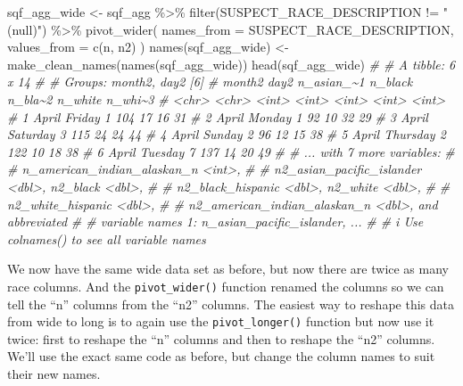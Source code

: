 \documentclass[
  a4paper,
]{krantz}
\makeatletter
\newenvironment{Shaded}{\begin{snugshade}}{\end{snugshade}}
\newcommand{\AttributeTok}[1]{\textcolor[rgb]{0.61,0.61,0.61}{#1}}
\newcommand{\CommentTok}[1]{\textcolor[rgb]{0.37,0.37,0.37}{\textit{#1}}}
\newcommand{\FunctionTok}[1]{\textcolor[rgb]{0,0,0}{#1}}
\newcommand{\NormalTok}[1]{#1}
\newcommand{\OtherTok}[1]{\textcolor[rgb]{0.37,0.37,0.37}{#1}}
\newcommand{\SpecialCharTok}[1]{\textcolor[rgb]{0,0,0}{#1}}
\newcommand{\StringTok}[1]{\textcolor[rgb]{0.5,0.5,0.5}{#1}}
\newenvironment{kframe}{%
\medskip{}
\setlength{\fboxsep}{.8em}
 \def\at@end@of@kframe{}%
 \ifinner\ifhmode%
  \def\at@end@of@kframe{\end{minipage}}%
  \begin{minipage}{\columnwidth}%
 \fi\fi%
 \def\FrameCommand##1{\hskip\@totalleftmargin \hskip-\fboxsep
 \colorbox{shadecolor}{##1}\hskip-\fboxsep
     \hskip-\linewidth \hskip-\@totalleftmargin \hskip\columnwidth}%
 \MakeFramed {\advance\hsize-\width
   \@totalleftmargin\z@ \linewidth\hsize
   \@setminipage}}%
 {\par\unskip\endMakeFramed%
 \at@end@of@kframe}
\renewenvironment{Shaded}{\begin{kframe}}{\end{kframe}}
\makeatother
\begin{document}
\begin{Shaded}
\begin{Highlighting}[]
\NormalTok{sqf\_agg\_wide }\OtherTok{\textless{}{-}}\NormalTok{ sqf\_agg }\SpecialCharTok{\%\textgreater{}\%}
  \FunctionTok{filter}\NormalTok{(SUSPECT\_RACE\_DESCRIPTION }\SpecialCharTok{!=} \StringTok{"(null)"}\NormalTok{) }\SpecialCharTok{\%\textgreater{}\%}
  \FunctionTok{pivot\_wider}\NormalTok{(}
    \AttributeTok{names\_from =}\NormalTok{ SUSPECT\_RACE\_DESCRIPTION,}
    \AttributeTok{values\_from =} \FunctionTok{c}\NormalTok{(n, n2)}
\NormalTok{  )}
\FunctionTok{names}\NormalTok{(sqf\_agg\_wide) }\OtherTok{\textless{}{-}} \FunctionTok{make\_clean\_names}\NormalTok{(}\FunctionTok{names}\NormalTok{(sqf\_agg\_wide))}
\FunctionTok{head}\NormalTok{(sqf\_agg\_wide)}
\CommentTok{\# \# A tibble: 6 x 14}
\CommentTok{\# \# Groups:   month2, day2 [6]}
\CommentTok{\#   month2 day2     n\_asian\_\textasciitilde{}1 n\_black n\_bla\textasciitilde{}2 n\_white n\_whi\textasciitilde{}3}
\CommentTok{\#   \textless{}chr\textgreater{}  \textless{}chr\textgreater{}         \textless{}int\textgreater{}   \textless{}int\textgreater{}   \textless{}int\textgreater{}   \textless{}int\textgreater{}   \textless{}int\textgreater{}}
\CommentTok{\# 1 April  Friday            1     104      17      16      31}
\CommentTok{\# 2 April  Monday            1      92      10      32      29}
\CommentTok{\# 3 April  Saturday          3     115      24      24      44}
\CommentTok{\# 4 April  Sunday            2      96      12      15      38}
\CommentTok{\# 5 April  Thursday          2     122      10      18      38}
\CommentTok{\# 6 April  Tuesday           7     137      14      20      49}
\CommentTok{\# \# ... with 7 more variables:}
\CommentTok{\# \#   n\_american\_indian\_alaskan\_n \textless{}int\textgreater{},}
\CommentTok{\# \#   n2\_asian\_pacific\_islander \textless{}dbl\textgreater{}, n2\_black \textless{}dbl\textgreater{},}
\CommentTok{\# \#   n2\_black\_hispanic \textless{}dbl\textgreater{}, n2\_white \textless{}dbl\textgreater{},}
\CommentTok{\# \#   n2\_white\_hispanic \textless{}dbl\textgreater{},}
\CommentTok{\# \#   n2\_american\_indian\_alaskan\_n \textless{}dbl\textgreater{}, and abbreviated}
\CommentTok{\# \#   variable names 1: n\_asian\_pacific\_islander, ...}
\CommentTok{\# \# i Use \textasciigrave{}colnames()\textasciigrave{} to see all variable names}
\end{Highlighting}
\end{Shaded}

We now have the same wide data set as before, but now there
are twice as many race columns. And the
\texttt{pivot\_wider()} function renamed the columns so we
can tell the ``n'' columns from the ``n2'' columns. The
easiest way to reshape this data from wide to long is to
again use the \texttt{pivot\_longer()} function but now use
it twice: first to reshape the ``n'' columns and then to
reshape the ``n2'' columns. We'll use the exact same code as
before, but change the column names to suit their new names.
\end{document}
